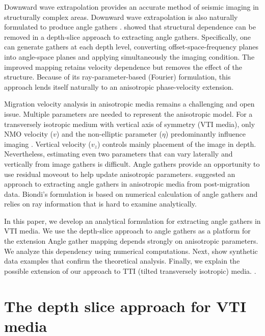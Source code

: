 Downward wave extrapolation provides an accurate method of seismic
imaging in structurally complex areas. Downward wave extrapolation is
also naturally formulated to produce angle gathers
\cite[]{GEO55-09-12231234,SEG-2000-08300833,GEO67-03-08830889,wu,GEO68-03-10651074,SEG-2003-08890892,new,coord}.
 \cite{SEG-2004-10531056} showed that
structural dependence can be removed in a depth-slice approach to
extracting angle gathers. Specifically, one can generate gathers at
each depth level, converting offset-space-frequency planes into
angle-space planes and applying simultaneously the imaging
condition. The improved mapping retains velocity dependence but
removes the effect of the structure. Because of its
ray-parameter-based (Fourier) formulation, this approach lends itself
naturally to an anisotropic phase-velocity extension.

Migration velocity analysis in anisotropic media remains a challenging
 and open issue. Multiple parameters are needed to represent the
 anisotropic model. For a transversely isotropic medium with vertical
 axis of symmetry (VTI media), only NMO velocity ($v$) and the
 non-elliptic parameter ($\eta$) predominantly influence imaging
 \cite[]{GEO60-05-15501566,tariq-lat}. Vertical velocity ($v_z$)
 controls mainly placement of the image in depth.  Nevertheless,
 estimating even two parameters that can vary laterally and vertically
 from image gathers is difficult. Angle gathers provide an opportunity
 to use residual moveout  to help update
 anisotropic parameters. \cite{biondianis} suggested an approach to
 extracting angle gathers in anisotropic media from post-migration
 data. Biondi's formulation is based on numerical calculation of angle gathers and relies on ray information that is hard to examine analytically. 

In this paper, we develop an analytical formulation for extracting
angle gathers in VTI  media.  We use the depth-slice approach to angle
gathers as a platform for the extension  Angle gather mapping depends
strongly on anisotropic parameters. We analyze this dependency using
numerical computations. Next,  show synthetic data examples that confirm the theoretical analysis. Finally, we explain the possible extension of our approach to TTI (tilted transversely isotropic) media.
 \cite{SEG-2004-10531056}.

\section{The depth slice approach for VTI media}

